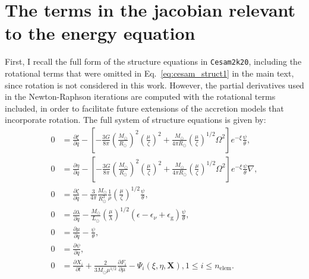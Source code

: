 \documentclass[12pt,a4paper]{article}
\newcommand{\mr}{\mathrm}
\newcommand{\pfird}[2][]{\frac{\partial#1}{\partial#2}}
\newcommand{\bvec}[1]{\boldsymbol{#1}}
\begin{document}
\newpage
{}
\appendix

\section*{The terms in the jacobian relevant to the energy equation}
\label{app:jacobian}
\renewcommand{\theequation}{A.\arabic{equation}}
\setcounter{equation}{0}

First, I recall the full form of the structure equations in \texttt{Cesam2k20}, including the rotational terms that were omitted in Eq.~\eqref{eq:cesam_struct1} in the main text, since rotation is not considered in this work. However, the partial derivatives used in the Newton-Raphson iterations are computed with the rotational terms included, in order to facilitate future extensions of the accretion models that incorporate rotation. The full system of structure equations is given by:
\begin{subequations} \label{eq:cesam2k20_struct_eq_full}
  \begin{align}
    0 &= \pfird[\xi]{q} - \left[-\frac{3G}{8\pi}\left(\frac{M_\odot}{R_\odot}\right)^2\left(\frac{\mu}{\zeta}\right)^2 + \frac{M_\odot}{4\pi R_\odot}\left(\frac{\mu}{\zeta}\right)^{1/2} \Omega^2\right]e^{-\xi}\frac{\psi}{\theta}, \label{eq:cesam_struct1_full}\\
    0 &= \pfird[\eta]{q} - \left[-\frac{3G}{8\pi}\left(\frac{M_\odot}{R_\odot}\right)^2\left(\frac{\mu}{\zeta}\right)^2 + \frac{M_\odot}{4\pi R_\odot}\left(\frac{\mu}{\zeta}\right)^{1/2} \Omega^2\right]e^{-\xi}\frac{\psi}{\theta}\nabla, \label{eq:cesam_struct2_full}\\
    0 &= \pfird[\zeta]{q} - \frac{3}{4\pi}\frac{M_\odot}{R_\odot^3}\frac{1}{\rho}\left(\frac{\mu}{\zeta}\right)^{1/2}\frac{\psi}{\theta}, \label{eq:cesam_struct3_full}\\
    0 &= \pfird[\lambda]{q} - \frac{M_\odot}{L_\odot}\left(\frac{\mu}{\lambda}\right)^{1/2}(\epsilon  - \epsilon_\nu + \epsilon_\mr{g})\frac{\psi}{\theta}, \label{eq:cesam_struct4_full}\\
    0 &= \pfird[\mu]{q} - \frac{\psi}{\theta}, \label{eq:cesam_struct5_full}\\
    0 &= \pfird[\psi]{q}, \label{eq:cesam_struct6_full}\\
    0 &= \pfird[X_i]{t} + \frac{2}{3 M_\odot\mu^{1/2}}\pfird[F_i]{\mu} - \Psi_i(\xi, \eta, \bvec{X}), 1\leq i \leq n_\mr{elem}. \label{eq:cesam_struct7_full}
  \end{align}
\end{subequations}
\end{document}

